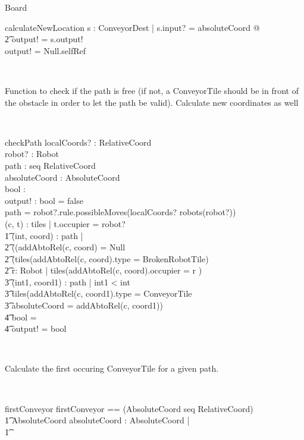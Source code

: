 \documentclass[12pt]{article}
\begin{document}
\begin{class}{Board}
\begin{schema}{calculateNewLocation}
\exists s : ConveyorDest | s.input? = absoluteCoord @ \\ \t2
output! = s.output! \\
\ELSE output! = Null.selfRef
\end{schema} \\
\begin{classcom}
Function to check if the path is free (if not, a ConveyorTile should be in front of the obstacle in order to let the path be valid). Calculate new coordinates as well
\end{classcom} \\
\begin{schema}{checkPath}
localCoords? : RelativeCoord \\
robot? : Robot \\
path : seq RelativeCoord \\
absoluteCoord : AbsoluteCoord \\
bool : \bool \\
output! : \bool
\where
bool = false \\
path = robot?.rule.possibleMoves(localCoords? \cross robots(robot?)) \\
\exists (c, t) : tiles | t.occupier = robot? \implies \\ \t1
\forall (int, coord) : path | \\ \t2
((addAbtoRel(c, coord) = Null \vee \\ \t2
(tiles(addAbtoRel(c, coord).type = BrokenRobotTile) \vee \\ \t2
\exists r: Robot | tiles(addAbtoRel(c, coord).occupier = r )\implies \\ \t3
\exists (int1, coord1) : path | int1 < int \\ \t3
tiles(addAbtoRel(c, coord1).type = ConveyorTile \\ \t3
absoluteCoord = addAbtoRel(c, coord1)) \implies \\ \t4
bool = \true \\ \t4
output! = bool
\end{schema} \\
\znewpage
\begin{classcom}
Calculate the first occuring ConveyorTile for a given path.
\end{classcom} \\
\begin{schema}{firstConveyor}
firstConveyor == (AbsoluteCoord \cross seq RelativeCoord) \fun \\ \t1 AbsoluteCoord
\where
\exists absoluteCoord : AbsoluteCoord |  \\ \t1

\end{schema}
\end{class}
\end{document}
